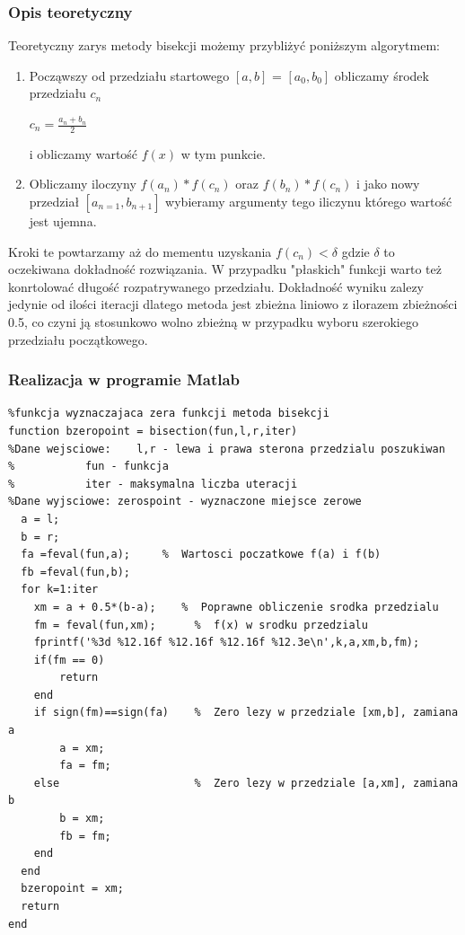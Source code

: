 \documentclass[a4paper, 11pt]{article}
\begin{document}
\subsubsection{Opis teoretyczny}
Teoretyczny zarys metody bisekcji możemy przybliżyć poniższym algorytmem:
\begin{enumerate}
  \item Począwszy od przedziału startowego $[a,b]$ = $[a_{0},b_{0}]$ obliczamy środek przedziału $c_{n}$\\
  	\begin{center}
  	$c_{n} = \frac{a_{n}+b_{n}}{2}$\\
	\end{center}
  i obliczamy wartość $f(x)$ w tym punkcie. 
  \item Obliczamy iloczyny $f(a_{n})*f(c_{n})$ oraz $f(b_{n})*f(c_{n})$ i jako nowy przedział $[a_{n=1},b_{n+1}]$
  wybieramy argumenty tego iliczynu którego wartość jest ujemna. 
\end{enumerate} 
Kroki te powtarzamy aż do mementu uzyskania $f(c_{n})<\delta$ gdzie $\delta$ to oczekiwana dokładność rozwiązania. W przypadku "płaskich"  funkcji warto też konrtolować długość rozpatrywanego przedziału. 
Dokładność wyniku zalezy jedynie od ilości iteracji dlatego metoda jest zbieżna liniowo z ilorazem zbieżności 0.5, co czyni ją stosunkowo wolno zbieżną w przypadku wyboru szerokiego przedziału początkowego. 



\subsubsection{Realizacja w programie Matlab}
\begin{lstlisting}
%funkcja wyznaczajaca zera funkcji metoda bisekcji
function bzeropoint = bisection(fun,l,r,iter)
%Dane wejsciowe:	l,r - lewa i prawa sterona przedzialu poszukiwan
%			fun - funkcja 
%			iter - maksymalna liczba uteracji
%Dane wyjsciowe: zerospoint - wyznaczone miejsce zerowe
  a = l; 
  b = r;
  fa =feval(fun,a);     %  Wartosci poczatkowe f(a) i f(b)
  fb =feval(fun,b);
  for k=1:iter
    xm = a + 0.5*(b-a);    %  Poprawne obliczenie srodka przedzialu
    fm = feval(fun,xm);      %  f(x) w srodku przedzialu
    fprintf('%3d %12.16f %12.16f %12.16f %12.3e\n',k,a,xm,b,fm);
    if(fm == 0)
        return
    end
    if sign(fm)==sign(fa)    %  Zero lezy w przedziale [xm,b], zamiana a
        a = xm;
        fa = fm;
    else                     %  Zero lezy w przedziale [a,xm], zamiana b
        b = xm;
        fb = fm;
    end
  end
  bzeropoint = xm; 
  return
end
\end{lstlisting}
\end{document}
